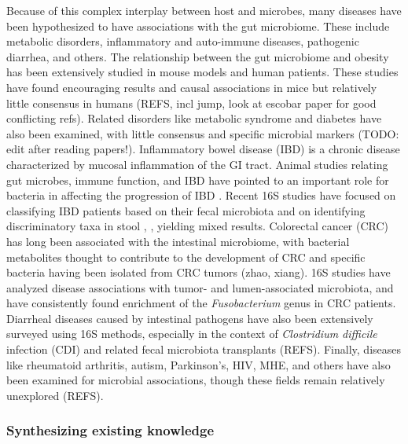 \documentclass[12pt]{article}
\begin{document}
Because of this complex interplay between host and microbes, many 
diseases have been hypothesized to have associations with the gut 
microbiome. These include metabolic disorders,
inflammatory and auto-immune diseases, pathogenic diarrhea, and others.
The relationship between the gut microbiome and obesity has been 
extensively studied in mouse models and human patients. These studies
have found encouraging results and causal associations in mice but 
relatively little consensus in humans (REFS, incl jump, look at escobar 
paper for good conflicting refs). Related disorders like metabolic 
syndrome and diabetes have also been examined, with little consensus and 
specific microbial markers (TODO: edit after reading papers!). 
Inflammatory bowel disease (IBD) is a chronic disease characterized by 
mucosal inflammation of the GI tract. Animal studies relating gut 
microbes, immune function, and IBD have pointed to an important role for 
bacteria in affecting the progression of IBD \cite{tamboli-ibd-2004}. 
Recent 16S studies have focused on classifying IBD patients based on 
their fecal microbiota and on identifying discriminatory taxa in stool \cite{papa}, \cite{gevers}, yielding mixed results. 
Colorectal cancer (CRC) has long been associated with the intestinal 
microbiome, with bacterial metabolites thought to contribute to the 
development of CRC and specific bacteria having been isolated from CRC 
tumors (zhao, xiang). 16S studies have analyzed disease associations with 
tumor- and lumen-associated microbiota, and have consistently found 
enrichment of the \textit{Fusobacterium} genus in CRC patients. 
Diarrheal diseases caused by intestinal pathogens have also been extensively 
surveyed using 16S methods, especially in the context of 
\textit{Clostridium difficile} infection (CDI) and related fecal 
microbiota transplants (REFS). Finally, diseases like rheumatoid 
arthritis, autism, Parkinson's, HIV, MHE, and others have also been 
examined for microbial associations, though these fields remain 
relatively unexplored (REFS).

\subsubsection{Synthesizing existing knowledge}
\end{document}
